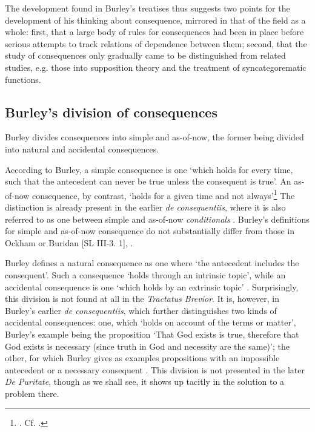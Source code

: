 \documentclass[]{article}
\begin{document}
The development found in Burley's treatises thus suggests two points for the development of his thinking about consequence, mirrored in that of the field as a whole: first, that a large body of rules for consequences had been in place before serious attempts to track relations of dependence between them; second, that the study of consequences only gradually came to be distinguished from related studies, e.g. those into supposition theory and the treatment of syncategorematic functions.
\subsection{Burley's division of consequences}
Burley divides consequences into simple and as-of-now, the former being divided into natural and accidental consequences. 

According to Burley, a simple consequence is one `which holds for every time, such that the antecedent can never be true unless the consequent is true'. An as-of-now consequence, by contrast, `holds for a given time and not always'\footnote{\cite[pp. 60.29-61.5]{BurleyDPAL}. Cf. \cite[p. 199.19-25]{BurleyDPAL}.} The distinction is already present in the earlier \textit{de consequentiis}, where it is also referred to as one between simple and as-of-now \textit{conditionals} \cite[p. 128, par. 69]{Green-Pedersen1980b}. Burley's definitions for simple and as-of-now consequence do not substantially differ from those in Ockham or Buridan [SL III-3. 1], \cite[I. 4]{BuridanTC}.

Burley defines a natural consequence as one where `the antecedent includes the consequent'. Such a consequence `holds through an intrinsic topic', while an accidental consequence is one `which holds by an extrinsic topic' \cite[p. 61.6-10]{BurleyDPAL}. Surprisingly, this division is not found at all in the \textit{Tractatus Brevior}. It is, however, in Burley's earlier \textit{de consequentiis}, which further distinguishes two kinds of accidental consequences: one, which `holds on account of the terms or matter', Burley's example being the proposition `That God exists is true, therefore that God exists is necessary (since truth in God and necessity are the same)'; the other, for which Burley gives as examples propositions with an impossible antecedent or a necessary consequent \cite[pp. 128-129, par. 70]{Green-Pedersen1980b}. This division is not presented in the later \textit{De Puritate}, though as we shall see, it shows up tacitly in the solution to a problem there.
\end{document}
